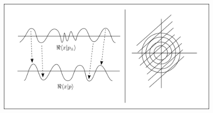 \documentclass{article}
\begin{document}
\begin{figure}[ht]
    \centering
    \includegraphics[width=\linewidth]{Figures/stationary_scattering.png}
    \caption*{}
    \label{fig:stationary_sc}
\end{figure}
\end{document}
